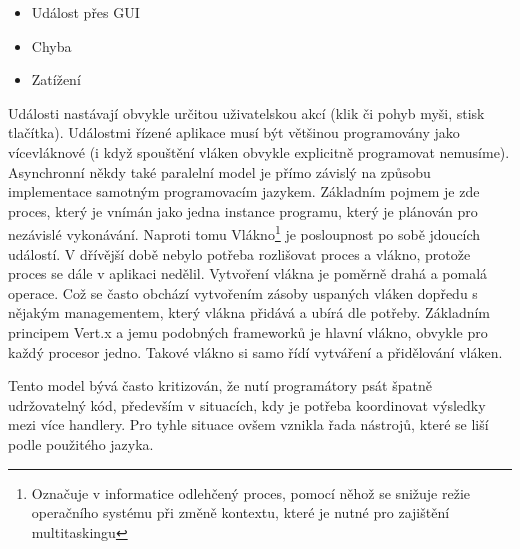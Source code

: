 \begin{itemize}
\item Událost přes GUI
\item Chyba
\item Zatížení
\end{itemize}

Události nastávají obvykle určitou uživatelskou akcí (klik či pohyb myši, stisk tlačítka).
Událostmi řízené aplikace musí být většinou programovány jako vícevláknové (i když spouštění vláken obvykle explicitně programovat nemusíme).
Asynchronní někdy také paralelní model je přímo závislý na způsobu implementace samotným programovacím jazykem. Základním pojmem je zde proces, který je vnímán jako jedna instance programu, který je plánován pro nezávislé vykonávání. Naproti tomu Vlákno\footnote{Označuje v informatice odlehčený proces, pomocí něhož se snižuje režie operačního systému při změně kontextu, které je nutné pro zajištění multitaskingu} je posloupnost po sobě jdoucích událostí. V dřívější době nebylo potřeba rozlišovat proces a vlákno, protože proces se dále v aplikaci nedělil. Vytvoření vlákna je poměrně drahá a pomalá operace. Což se často obchází vytvořením zásoby uspaných vláken dopředu s nějakým managementem, který vlákna přidává a ubírá dle potřeby. Základním principem Vert.x a jemu podobných frameworků je hlavní vlákno, obvykle pro každý procesor jedno. Takové vlákno si samo řídí vytváření a přidělování vláken.

Tento model bývá často kritizován, že nutí programátory psát špatně udržovatelný kód, především v situacích, kdy je potřeba koordinovat výsledky mezi více handlery. Pro tyhle situace ovšem vznikla řada nástrojů, které se liší podle použitého jazyka.

